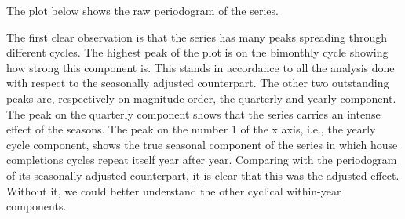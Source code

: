 \documentclass[12pt]{article} %
\begin{document}
The plot below shows the raw periodogram of the series. 



The first clear observation is that the series has many peaks spreading through different cycles. The highest peak of the plot is on the bimonthly cycle showing how strong this component is. This stands in accordance to all the analysis done with respect to the seasonally adjusted counterpart. The other two outstanding peaks are, respectively on magnitude order, the quarterly and yearly component. The peak on the quarterly component shows that the series carries an intense effect of the seasons. The peak on the number 1 of the x axis, i.e., the yearly cycle component, shows the true seasonal component of the series in which house completions cycles repeat itself year after year. Comparing with the periodogram of its seasonally-adjusted counterpart, it is clear that this was the adjusted effect. Without it, we could better understand the other cyclical within-year components.


\label{Bibliography}

 


\end{document}
